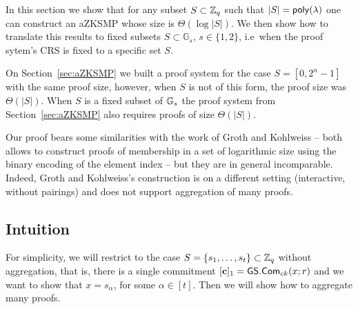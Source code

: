 \newcommand{\setsize}{t}

In this section we show that for any subset \(S\subset\mathbb{Z}_q\) such that \(|S|=\mathsf{poly}(\lambda)\) one can construct an aZKSMP whose size is \(\Theta(\log|S|)\). We then show how to translate this results to fixed subsets \(S\subset\mathbb{G}_s\), \(s\in\{1,2\}\), i.e~when the proof sytem's CRS is fixed to a specific set \(S\).

On Section~\ref{sec:aZKSMP} we built a proof system for the case \(S=[0,2^n-1]\) with the same proof size, however, when \(S\) is not of this form, the proof size was \(\Theta(|S|)\). When \(S\) is a fixed subset of \(\mathbb{G}_s\) the proof system from Section~\ref{sec:aZKSMP} also requires proofs of size \(\Theta(|S|)\).

Our proof bears some similarities with the work of Groth and Kohlweiss \cite{EC:GroKoh15} -- both allows to construct proofs of membership in a set of logarithmic size using the binary encoding of the element index -- but they are in general incomparable. Indeed, Groth and Kohlweiss's construction is on a different setting (interactive, without pairings) and does not support aggregation of many proofs.

\subsection{Intuition}

For simplicity, we will restrict to the case \(S=\{s_1,\ldots,s_\setsize \}\subset\Z_q\) without aggregation, that is, there is a single commitment \([\mathbf{c}]_1={\mathsf{GS}}.\mathsf{Com}_{ck}(x;r)\) and we want to show that \(x=s_\alpha\), for some \(\alpha\in[\setsize ]\). Then we will show how to aggregate many proofs.

